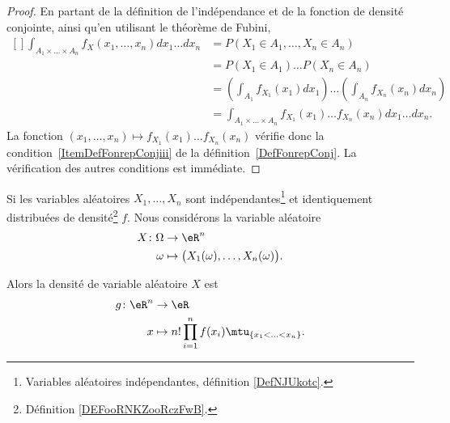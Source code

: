 \begin{proof}
	En partant de la définition de l'indépendance et de la fonction de densité conjointe, ainsi qu'en utilisant le théorème de Fubini,
	\begin{equation}
		\begin{aligned}[]
			\int_{A_1\times \ldots\times A_n}f_X(x_1,\ldots,x_n)dx_1\ldots dx_n & =
			P(X_1\in A_1,\ldots,X_n\in A_n)                                                                                                                                 \\
			                                                                    & =P(X_1\in A_1)\ldots P(X_n\in A_n)                                                        \\
			                                                                    & =\left( \int_{A_1}f_{X_1}(x_1)dx_1 \right)\ldots\left( \int_{A_n}f_{X_n}(x_n)dx_n \right) \\
			                                                                    & =\int_{A_1\times\ldots\times A_n}f_{X_1}(x_1)\ldots f_{X_n}(x_n)dx_1\ldots dx_n.
		\end{aligned}
	\end{equation}
	La fonction \( (x_1,\ldots,x_n)\mapsto f_{X_1}(x_1)\ldots f_{X_n}(x_n)\) vérifie donc la condition~\ref{ItemDefFonrepConjiii} de la définition~\ref{DefFonrepConj}. La vérification des autres conditions est immédiate.
\end{proof}


\begin{lemma}     \label{LEMooLNIZooDWUvRN}
	Si les variables aléatoires \( X_1,\ldots, X_n\) sont indépendantes\footnote{Variables aléatoires indépendantes, définition \ref{DefNJUkotc}.} et identiquement distribuées de densité\footnote{Définition \ref{DEFooRNKZooRczFwB}.} \( f\). Nous considérons la variable aléatoire
	\begin{equation}
		\begin{aligned}
			X\colon \Omega & \to \eR^n                                           \\
			\omega         & \mapsto \big( X_1(\omega),\ldots,X_n(\omega) \big).
		\end{aligned}
	\end{equation}

	Alors la densité de variable aléatoire \( X\) est
	\begin{equation}
		\begin{aligned}
			g\colon \eR^n & \to \eR                                                      \\
			x             & \mapsto    n!\prod_{i=1}^nf(x_i)\mtu_{\{ x_1<\ldots<x_n \}}.
		\end{aligned}
	\end{equation}
\end{lemma}

